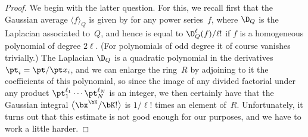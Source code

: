 \begin{proof}
We begin with the latter question. For this, we recall first that the Gaussian
average $\langle f\rangle_Q$ is given by  for any power
series~$f$, where $\D_Q$ is the Laplacian associated to~$Q$, and hence is equal to
$\D_Q^\ell(f)/\ell!$ if $f$ is a homogeneous polynomial of degree $2\ell$. (For
polynomials of odd degree it of course vanishes trivially.) The Laplacian $\D_Q$
is a quadratic polynomial in the derivatives $\pt_i=\pt/\pt x_i$, and we can enlarge
the ring~$R$ by adjoining to it the coefficients of this polynomial, so since the
image of any divided factorial under any product $\pt_1^{\ell_1}\cdots\pt_N^{\ell_N}$
is an integer, we then certainly have that the Gaussian integral
$\big\langle\bx^\bK/\bK! \big\rangle$ is $1/\ell!$ times an element of~$R$. Unfortunately,
it turns out that this estimate is not good enough for our purposes, and we have
to work a little harder.


\end{proof}
